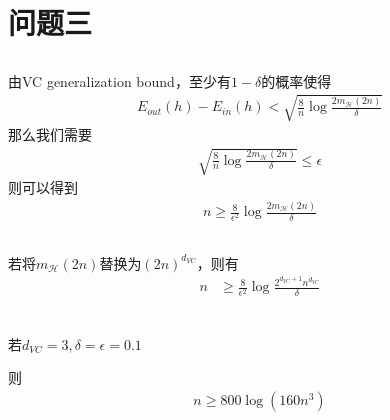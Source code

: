 \documentclass[12pt, a4paper]{article}
\begin{document}
\section{问题三}

\subsection{}

由VC generalization bound，至少有$1-\delta$的概率使得
\begin{align*}
    E_{out}(h)-E_{in}(h)<\sqrt{\frac{8}{n}\log\frac{2m_{\mathcal{H}}(2n)}{\delta}}
\end{align*}
那么我们需要
\begin{align*}
    \sqrt{\frac{8}{n}\log\frac{2m_{\mathcal{H}}(2n)}{\delta}} \leq \epsilon
\end{align*}
则可以得到
\begin{align*}
    n \geq \frac{8}{\epsilon^2}\log\frac{2m_{\mathcal{H}}(2n)}{\delta}
\end{align*}

\subsection{}

若将$m_{\mathcal{H}}(2n)$替换为$(2n)^{d_{VC}}$，则有
\begin{align*}
    n &\geq \frac{8}{\epsilon^2}\log\frac{2^{d_{VC}+1} n^{d_{VC}}}{\delta}\\
\end{align*}

\subsection{}

若$d_{VC}=3, \delta=\epsilon=0.1$

则
\begin{align*}
    n \geq 800 \log(160n^3)
\end{align*}
\end{document}
